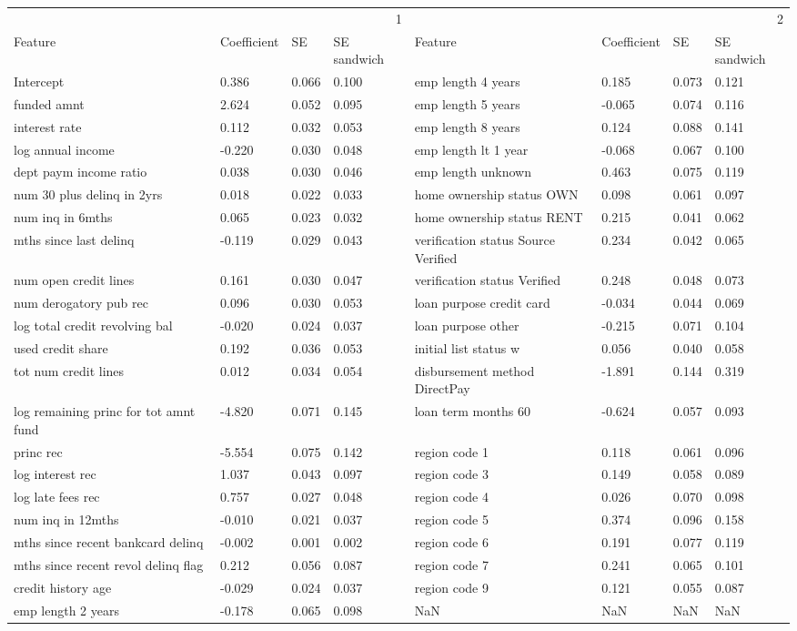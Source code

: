 \begin{tabular}{llllllll}
\toprule
\multicolumn{4}{r}{1} & \multicolumn{4}{r}{2} \\
Feature & Coefficient & SE & SE sandwich & Feature & Coefficient & SE & SE sandwich \\
\midrule
Intercept & 0.386 & 0.066 & 0.100 & emp length 4 years & 0.185 & 0.073 & 0.121 \\
funded amnt & 2.624 & 0.052 & 0.095 & emp length 5 years & -0.065 & 0.074 & 0.116 \\
interest rate & 0.112 & 0.032 & 0.053 & emp length 8 years & 0.124 & 0.088 & 0.141 \\
log annual income & -0.220 & 0.030 & 0.048 & emp length  lt  1 year & -0.068 & 0.067 & 0.100 \\
dept paym income ratio & 0.038 & 0.030 & 0.046 & emp length unknown & 0.463 & 0.075 & 0.119 \\
num 30 plus  delinq in 2yrs & 0.018 & 0.022 & 0.033 & home ownership status OWN & 0.098 & 0.061 & 0.097 \\
num inq in 6mths & 0.065 & 0.023 & 0.032 & home ownership status RENT & 0.215 & 0.041 & 0.062 \\
mths since last delinq & -0.119 & 0.029 & 0.043 & verification status Source Verified & 0.234 & 0.042 & 0.065 \\
num open credit lines & 0.161 & 0.030 & 0.047 & verification status Verified & 0.248 & 0.048 & 0.073 \\
num derogatory pub rec & 0.096 & 0.030 & 0.053 & loan purpose credit card & -0.034 & 0.044 & 0.069 \\
log total credit revolving bal & -0.020 & 0.024 & 0.037 & loan purpose other & -0.215 & 0.071 & 0.104 \\
used credit share & 0.192 & 0.036 & 0.053 & initial list status w & 0.056 & 0.040 & 0.058 \\
tot num credit lines & 0.012 & 0.034 & 0.054 & disbursement method DirectPay & -1.891 & 0.144 & 0.319 \\
log remaining princ for tot amnt fund & -4.820 & 0.071 & 0.145 & loan term months 60 & -0.624 & 0.057 & 0.093 \\
princ rec & -5.554 & 0.075 & 0.142 & region code 1 & 0.118 & 0.061 & 0.096 \\
log interest rec & 1.037 & 0.043 & 0.097 & region code 3 & 0.149 & 0.058 & 0.089 \\
log late fees rec & 0.757 & 0.027 & 0.048 & region code 4 & 0.026 & 0.070 & 0.098 \\
num inq in 12mths & -0.010 & 0.021 & 0.037 & region code 5 & 0.374 & 0.096 & 0.158 \\
mths since recent bankcard delinq & -0.002 & 0.001 & 0.002 & region code 6 & 0.191 & 0.077 & 0.119 \\
mths since recent revol delinq flag & 0.212 & 0.056 & 0.087 & region code 7 & 0.241 & 0.065 & 0.101 \\
credit history age & -0.029 & 0.024 & 0.037 & region code 9 & 0.121 & 0.055 & 0.087 \\
emp length 2 years & -0.178 & 0.065 & 0.098 & NaN & NaN & NaN & NaN \\
\bottomrule
\end{tabular}
